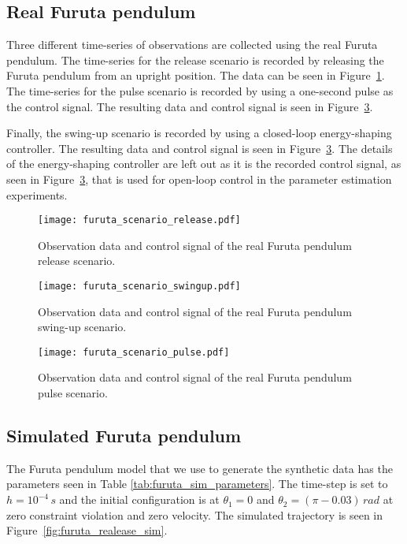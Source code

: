 \documentclass[preprint,12pt]{elsarticle}
\newcommand\figref{Figure~\ref}
\numberwithin{equation}{section}
\begin{document}
\subsection{Real Furuta pendulum}
\label{appendix:data_real_furuta_pendulum}
Three different time-series of observations are collected using the real Furuta pendulum.
The time-series for the release scenario is recorded by releasing the Furuta pendulum from an upright position.
The data can be seen in \figref{fig:furuta_release}.
The time-series for the pulse scenario is recorded by using a one-second pulse as the control signal.
The resulting data and control signal is seen in \figref{fig:furuta_pulse}.

Finally, the swing-up scenario is recorded by using a closed-loop energy-shaping controller.
The resulting data and control signal is seen in \figref{fig:furuta_pulse}.
The details of the energy-shaping controller are left out as it is the recorded control signal, as seen in \figref{fig:furuta_pulse}, that is used for open-loop control in the parameter estimation experiments.

\begin{figure}[ht]
    \centering
    \texttt{[image: furuta\_scenario\_release.pdf]}
    \caption{Observation data and control signal of the real Furuta pendulum release scenario.}
    \label{fig:furuta_release}
\end{figure}
\begin{figure}[ht]
    \centering
    \texttt{[image: furuta\_scenario\_swingup.pdf]}
    \caption{Observation data and control signal of the real Furuta pendulum swing-up scenario.}
    \label{fig:furuta_swingup}
\end{figure}
\begin{figure}[ht]
    \centering
    \texttt{[image: furuta\_scenario\_pulse.pdf]}
    \caption{Observation data and control signal of the real Furuta pendulum pulse scenario.}
    \label{fig:furuta_pulse}
\end{figure}


\subsection{Simulated Furuta pendulum}
\label{appendix:data_sim_furuta_pendulum}
The Furuta pendulum model that we use to generate the synthetic data has the parameters seen in Table \ref{tab:furuta_sim_parameters}.
The time-step is set to $h = 10^{-4}\,\si{s}$ and the initial configuration is at $\theta_1 = 0$ and $\theta_2 = (\pi - 0.03) \,\si{rad}$ at zero constraint violation and zero velocity.
The simulated trajectory is seen in \figref{fig:furuta_realease_sim}.
\end{document}
